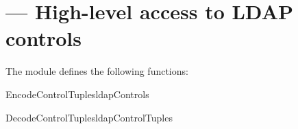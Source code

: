 
\section{ ---
  High-level access to LDAP controls }




The  module defines the following functions:

\begin{funcdesc}{EncodeControlTuples}{ldapControls} %


\end{funcdesc}


\begin{funcdesc}{DecodeControlTuples}{ldapControlTuples} %


\end{funcdesc}

